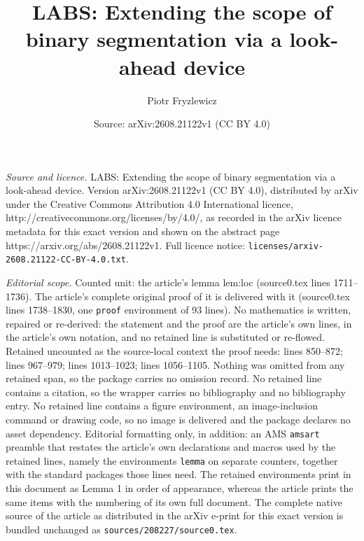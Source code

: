 \documentclass[10pt,a4paper]{amsart}
\title{LABS: Extending the scope of binary segmentation via a look-ahead device}
\author{Piotr Fryzlewicz}
\date{Source: arXiv:2608.21122v1 (CC BY 4.0)}
\begin{document}
\maketitle

\noindent\emph{Source and licence.} LABS: Extending the scope of binary segmentation via a look-ahead device. Version arXiv:2608.21122v1 (CC BY 4.0), distributed by arXiv under the Creative Commons Attribution 4.0 International licence, http://creativecommons.org/licenses/by/4.0/, as recorded in the arXiv licence metadata for this exact version and shown on the abstract page https://arxiv.org/abs/2608.21122v1. Full licence notice: \texttt{licenses/arxiv-2608.21122-CC-BY-4.0.txt}.\par\smallskip

\noindent\textit{Editorial scope.} Counted unit: the article's lemma lem:loc (source0.tex lines 1711--1736). The article's complete original proof of it is delivered with it (source0.tex lines 1738--1830, one \texttt{proof} environment of 93 lines). No mathematics is written, repaired or re-derived: the statement and the proof are the article's own lines, in the article's own notation, and no retained line is substituted or re-flowed.  Retained uncounted as the source-local context the proof needs: lines 850--872; lines 967--979; lines 1013--1023; lines 1056--1105.  Nothing was omitted from any retained span, so the package carries no omission record.  No retained line contains a citation, so the wrapper carries no bibliography and no bibliography entry.  No retained line contains a figure environment, an image-inclusion command or drawing code, so no image is delivered and the package declares no asset dependency.  Editorial formatting only, in addition: an AMS \texttt{amsart} preamble that restates the article's own declarations and macros used by the retained lines, namely the environments \texttt{lemma} on separate counters, together with the standard packages those lines need.  The retained environments print in this document as Lemma 1 in order of appearance, whereas the article prints the same items with the numbering of its own full document.  The complete native source of the article as distributed in the arXiv e-print for this exact version is bundled unchanged as \texttt{sources/208227/source0.tex}.
\end{document}
